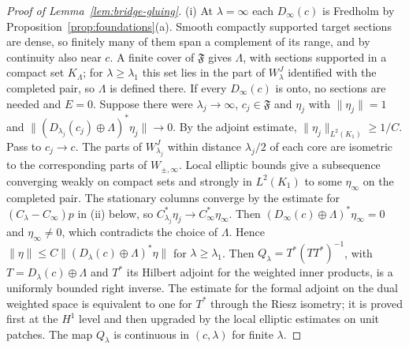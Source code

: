 \documentclass[11pt]{amsart}
\theoremstyle{definition}
\theoremstyle{remark}
\theoremstyle{plain}
\numberwithin{equation}{section}
\begin{document}
\begin{proof}[Proof of Lemma~\ref{lem:bridge-gluing}]
(i) At $\lambda=\infty$ each $D_\infty(c)$ is Fredholm by
Proposition~\ref{prop:foundations}(a). Smooth compactly
supported target sections are dense, so finitely many of them span a
complement of its range, and by continuity also near $c$. A finite
cover of $\mathfrak F$ gives $\Lambda$, with sections supported in a
compact set $K_\Lambda$; for $\lambda\ge\lambda_1$ this set lies in the part
of $W^J_\lambda$ identified with the completed pair, so $\Lambda$ is defined
there. If every $D_\infty(c)$ is onto,
no sections are needed and $E=0$. Suppose there were $\lambda_j\to\infty$,
$c_j\in\mathfrak F$ and $\eta_j$ with $\|\eta_j\|=1$ and
$\|(D_{\lambda_j}(c_j)\oplus\Lambda)^*\eta_j\|\to0$. By the adjoint estimate,
$\|\eta_j\|_{L^2(K_1)}\ge1/C$. Pass to $c_j\to c$. The parts of $W^J_{\lambda_j}$ within
distance $\lambda_j/2$ of each core are isometric to the corresponding
parts of $W_{\pm,\infty}$. Local elliptic bounds give a subsequence
converging weakly on compact sets and strongly in $L^2(K_1)$ to some
$\eta_\infty$ on the completed pair. The stationary columns converge by the
estimate for $(C_\lambda-C_\infty)p$ in (ii) below, so
$C_{\lambda_j}^*\eta_j\to C_\infty^*\eta_\infty$. Then
$(D_\infty(c)\oplus\Lambda)^*\eta_\infty=0$ and
$\eta_\infty\neq0$, which contradicts the choice of $\Lambda$. Hence
$\|\eta\|\le C\|(D_\lambda(c)\oplus\Lambda)^*\eta\|$ for
$\lambda\ge\lambda_1$. Then $Q_\lambda=T^*(TT^*)^{-1}$, with
$T=D_\lambda(c)\oplus\Lambda$ and $T^*$ its Hilbert adjoint for the weighted
inner products, is a uniformly bounded right inverse. The estimate for the
formal adjoint on the dual weighted space is equivalent to one for $T^*$
through the Riesz isometry; it is proved first at the $H^1$ level and then
upgraded by the local elliptic estimates on unit patches. The map $Q_\lambda$ is
continuous in $(c,\lambda)$ for finite $\lambda$.


\end{proof}
\end{document}
